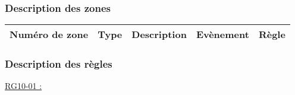 \documentclass{report}
\begin{document}
		\subsubsection{Description des zones}
		
			\begin{tabular}{|c|c|c|c|c|} \hline
				Numéro de zone & Type  & Description & Evènement &	Règle \\\hline
			\end{tabular}
			
		\subsubsection{Description des règles}

			\underline{RG10-01 :}
				\begin{quote}
				
				\end{quote}
	
\newpage
	
\end{document}
